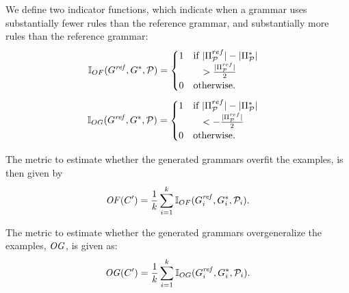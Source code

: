 
\noindent We define two indicator functions, which indicate when a grammar uses substantially fewer rules than the reference grammar, and substantially more rules than the reference grammar:
\begin{align*}
\mathbb{I}_{OF}(G^{\mathit{ref}}, G^*,\mathcal{P}) &= 
\begin{cases}
1 & \text{if } |\Pi^{ref}_\mathcal{P}| - |\Pi^*_\mathcal{P}|
\\ & \quad
> \frac{|\Pi^{ref}_\mathcal{P}|}{2} \\
0 & \text{otherwise.}
\end{cases}
\end{align*}
\begin{align*}
\mathbb{I}_{OG}(G^{\mathit{ref}}, G^*,\mathcal{P}) &= 
\begin{cases}
1 & \text{if } |\Pi^{ref}_\mathcal{P}| - |\Pi^*_\mathcal{P}|
\\ & \quad
< -\frac{|\Pi^{ref}_\mathcal{P}|}{2} \\
0 & \text{otherwise.}
\end{cases}
\end{align*}



The metric to estimate whether the generated grammars overfit the examples, is then given by
$$
 \mathit{OF}(C') = \frac{1}{k}\sum_{i=1}^{k} \mathbb{I}_{OF}(G^{\mathit{ref}}_i,G^*_i, \mathcal{P}_i).
$$


The metric to estimate whether the generated grammars overgeneralize the examples, $\mathit{OG}$, is given as:
\begin{align*}
    \mathit{OG}(C') = \frac{1}{k}\sum_{i=1}^{k}  \mathbb{I}_{OG}(G^{\mathit{ref}}_i, G^*_i, \mathcal{P}_i).
\end{align*}

